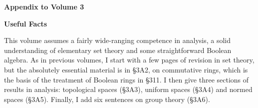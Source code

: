 
\def\chaptername{Appendix} 
\def\sectionname{Introduction} 
 
\centerline{\bf Appendix to Volume 3} 
 
\medskip 
 
\centerline{\bf Useful Facts} 
 
\medskip 
 
This volume assumes a fairly wide-ranging competence in analysis, a 
solid understanding of elementary set theory and some straightforward 
Boolean algebra.   As in previous volumes, I start with a few pages of 
revision in set theory, but the absolutely essential material is in 
\S3A2, on commutative 
rings, which is the basis of the treatment of Boolean rings in \S311. 
I then give three sections of results in analysis:  topological spaces 
(\S3A3), uniform spaces (\S3A4) and normed spaces (\S3A5).   Finally, I 
add six sentences on group theory (\S3A6). 
 
\discrpage 
 
